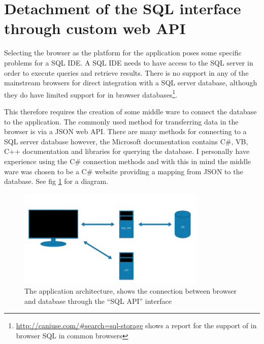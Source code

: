 \section{Detachment of the SQL interface through custom web
API}\label{detachment-of-the-sql-interface-through-custom-web-api}

Selecting the browser as the platform for the application poses some specific
problems for a SQL IDE. A SQL IDE
needs to have access to the SQL server in order to execute queries and retrieve
results. There is no support in any of the mainstream browsers for direct
integration with a SQL server database, although they do have limited support
for in browser databases\footnote{\url{http://caniuse.com/\#search=sql-storage}
shows a report for the support of in browser SQL in common browsers}.

This therefore requires the creation of some middle ware to connect the database
to the application. The commonly used method for transferring data in the
browser is via a JSON web API. There are many methods for connecting to a SQL
server database however, the Microsoft documentation contains C\#, VB, C++
documentation and libraries for querying the database.\cite{sqlserverconnect} I
personally have experience using the C\# connection methods and with this in mind
the middle ware was chosen to be a C\# website providing a mapping from JSON to
the database. See fig \ref{fig:apparch} for a diagram.

\begin{figure}
  \includegraphics[width=0.8\textwidth]{Figures/ApplicationArch.png}
  \caption{The application architecture, shows the connection between browser
  and database through the ``SQL API'' interface }
  \label{fig:apparch}
\end{figure}
